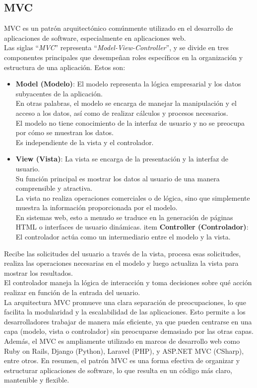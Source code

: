 \subsection{MVC~\cite{fowler2012patterns}}
MVC es un patrón arquitectónico comúnmente utilizado en el desarrollo de aplicaciones de software, 
especialmente en aplicaciones web. \\
Las siglas ``\emph{MVC}'' representa ``\emph{Model-View-Controller}'', y se divide en tres componentes principales 
que desempeñan roles específicos en la organización y estructura de una aplicación. 
Estos son:
\begin{itemize}
    \item \textbf{Model (Modelo)}: El modelo representa la lógica empresarial y los datos subyacentes 
    de la aplicación.\\ En otras palabras, el modelo se encarga de manejar la manipulación y 
    el acceso a los datos, así como de realizar cálculos y procesos necesarios.\\ 
    El modelo no tiene conocimiento de la interfaz de usuario y no se preocupa por cómo se muestran 
    los datos.\\ Es independiente de la vista y el controlador.
    \item \textbf{View (Vista)}: La vista se encarga de la presentación y la interfaz de usuario. \\
    Su función principal es mostrar los datos al usuario de una manera comprensible y atractiva. \\
    La vista no realiza operaciones comerciales o de lógica, sino que simplemente muestra la 
    información proporcionada por el modelo. \\
    En sistemas web, esto a menudo se traduce en la generación de páginas HTML o 
    interfaces de usuario dinámicas.
    item \textbf{Controller (Controlador)}: El controlador actúa como un intermediario entre el modelo y la vista. 
\end{itemize}

Recibe las solicitudes del usuario a través de la vista, procesa esas solicitudes, 
realiza las operaciones necesarias en el modelo y luego actualiza la vista para mostrar los resultados.\\
El controlador maneja la lógica de interacción y toma decisiones sobre qué acción realizar 
en función de la entrada del usuario.\\
La arquitectura MVC promueve una clara separación de preocupaciones, lo que facilita la modularidad y la escalabilidad de las aplicaciones. Esto permite a los desarrolladores trabajar de manera más eficiente, ya que pueden centrarse en una capa (modelo, vista o controlador) sin preocuparse demasiado por las otras capas. Además, el MVC es ampliamente utilizado en marcos de desarrollo web como Ruby on Rails, Django (Python), Laravel (PHP), y ASP.NET MVC (CSharp), entre otros.
En resumen, el patrón MVC es una forma efectiva de organizar y estructurar aplicaciones de software, lo que resulta en un código más claro, mantenible y flexible.

